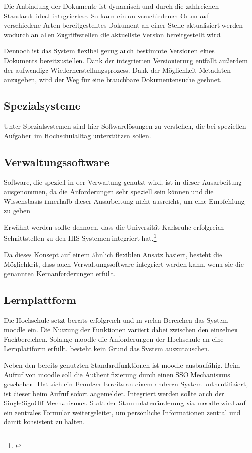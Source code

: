 Die Anbindung der Dokumente ist dynamisch und durch die zahlreichen Standards ideal integrierbar. So kann ein an verschiedenen Orten auf verschiedene Arten bereitgestelltes Dokument an einer Stelle aktualisiert werden wodurch an allen Zugriffsstellen die aktuellste Version bereitgestellt wird.

Dennoch ist das System flexibel genug auch bestimmte Versionen eines Dokuments bereitzustellen. Dank der integrierten Versionierung entfällt außerdem der aufwendige Wiederherstellungsprozess. Dank der Möglichkeit Metadaten anzugeben, wird der Weg für eine brauchbare Dokumentensuche geebnet.

\subsection{Spezialsysteme}
Unter Spezialsystemen sind hier Softwarelösungen zu verstehen, die bei speziellen Aufgaben im Hochschulalltag unterstützen sollen.

\subsection{Verwaltungssoftware}
Software, die speziell in der Verwaltung genutzt wird, ist in dieser Ausarbeitung ausgenommen, da die Anforderungen sehr speziell sein können und die Wissensbasis innerhalb dieser Ausarbeitung nicht ausreicht, um eine Empfehlung zu geben.

Erwähnt werden sollte dennoch, dass die Universität Karlsruhe erfolgreich Schnittstellen zu den HIS-Systemen integriert hat.\footnote{\cite{dini_webportale_2007}}

Da dieses Konzept auf einem ähnlich flexiblen Ansatz basiert, besteht die Möglichkeit, dass auch Verwaltungssoftware integriert werden kann, wenn sie die genannten Kernanforderungen erfüllt.

\subsection{Lernplattform}
Die Hochschule setzt bereits erfolgreich und in vielen Bereichen das System moodle ein. Die Nutzung der Funktionen variiert dabei zwischen den einzelnen Fachbereichen.
Solange moodle die Anforderungen der Hochschule an eine Lernplattform erfüllt, besteht kein Grund das System auszutauschen.

Neben den bereits genutzten Standardfunktionen ist moodle ausbaufähig.
Beim Aufruf von moodle soll die Authentifizierung durch einen SSO Mechanismus geschehen. Hat sich ein Benutzer bereits an einem anderen System authentifiziert, ist dieser beim Aufruf sofort angemeldet. Integriert werden sollte auch der SingleSignOff Mechanismus.
Statt der Stammdatenänderung via moodle wird auf ein zentrales Formular weitergeleitet, um persönliche Informationen zentral und damit konsistent zu halten.

